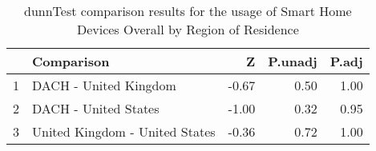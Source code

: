 \begin{table}[ht]
\centering
\begin{tabular}{rlrrr}
  \hline
 & Comparison & Z & P.unadj & P.adj \\ 
  \hline
1 & DACH - United Kingdom & -0.67 & 0.50 & 1.00 \\ 
  2 & DACH - United States & -1.00 & 0.32 & 0.95 \\ 
  3 & United Kingdom - United States & -0.36 & 0.72 & 1.00 \\ 
   \hline
\end{tabular}
\caption{dunnTest comparison results for the usage of Smart Home Devices Overall by Region of Residence} 
\end{table}
